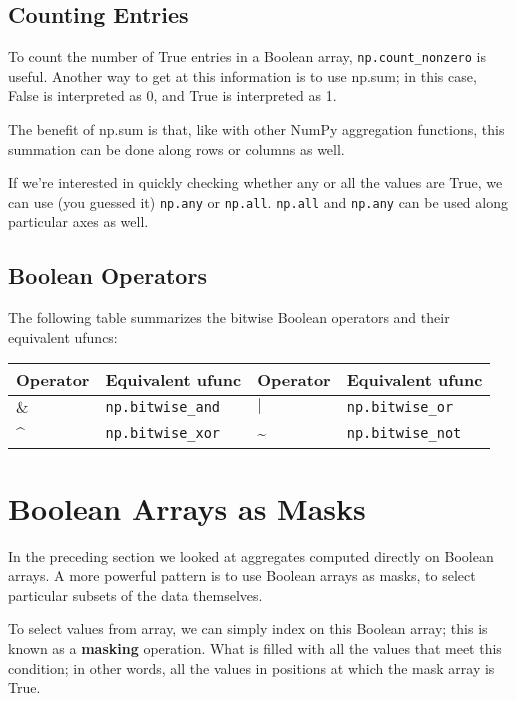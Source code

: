 \subsection*{Counting Entries}
To count the number of True entries in a Boolean array, \verb|np.count_nonzero| is useful. Another way to get at this
information is to use np.sum; in this case, False is interpreted as 0, and True is interpreted as 1.

The benefit of np.sum is that, like with other NumPy aggregation functions, this summation can be done along rows or columns as well.

If we're interested in quickly checking whether any or all the values are True, we can
use (you guessed it) \verb|np.any| or \verb|np.all|. \verb|np.all| and \verb|np.any| can be used along particular axes as well.

\subsection*{Boolean Operators}
The following table summarizes the bitwise Boolean operators and their equivalent
ufuncs:

\begin{table}[H]
    \centering
    \begin{tabular}{llll}
        \hline
        Operator & Equivalent ufunc      & Operator & Equivalent ufunc      \\
        \hline
        $\&$     & \verb|np.bitwise_and| & $|$      & \verb|np.bitwise_or|  \\
        \^{}     & \verb|np.bitwise_xor| & \~{}     & \verb|np.bitwise_not| \\
        \hline
    \end{tabular}
\end{table}

\section{Boolean Arrays as Masks}
In the preceding section we looked at aggregates computed directly on Boolean
arrays. A more powerful pattern is to use Boolean arrays as masks, to select particular
subsets of the data themselves.

To select values from array, we can simply index on this Boolean array;
this is known as a \textbf{masking} operation. What is  filled with all the values that meet this
condition; in other words, all the values in positions at which the mask array is True.

